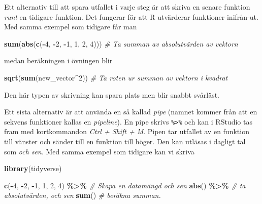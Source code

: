 \documentclass[
]{book}
\newenvironment{Shaded}{\begin{snugshade}}{\end{snugshade}}
\newcommand{\CommentTok}[1]{\textcolor[rgb]{0.56,0.35,0.01}{\textit{#1}}}
\newcommand{\DecValTok}[1]{\textcolor[rgb]{0.00,0.00,0.81}{#1}}
\newcommand{\FunctionTok}[1]{\textcolor[rgb]{0.13,0.29,0.53}{\textbf{#1}}}
\newcommand{\NormalTok}[1]{#1}
\newcommand{\SpecialCharTok}[1]{\textcolor[rgb]{0.81,0.36,0.00}{\textbf{#1}}}
\theoremstyle{definition}
\theoremstyle{definition}
\theoremstyle{definition}
\theoremstyle{definition}
\theoremstyle{remark}
\begin{document}
Ett alternativ till att spara utfallet i varje steg är att skriva en senare funktion \emph{runt} en tidigare funktion. Det fungerar för att R utvärderar funktioner inifrån-ut. Med samma exempel som tidigare får man

\begin{Shaded}
\begin{Highlighting}[]
\FunctionTok{sum}\NormalTok{(}\FunctionTok{abs}\NormalTok{(}\FunctionTok{c}\NormalTok{(}\SpecialCharTok{{-}}\DecValTok{4}\NormalTok{, }\SpecialCharTok{{-}}\DecValTok{2}\NormalTok{, }\SpecialCharTok{{-}}\DecValTok{1}\NormalTok{, }\DecValTok{1}\NormalTok{, }\DecValTok{2}\NormalTok{, }\DecValTok{4}\NormalTok{)))  }
\CommentTok{\# Ta summan av absolutvärden av vektorn}
\end{Highlighting}
\end{Shaded}

medan beräkningen i övningen blir

\begin{Shaded}
\begin{Highlighting}[]
\FunctionTok{sqrt}\NormalTok{(}\FunctionTok{sum}\NormalTok{(new\_vector}\SpecialCharTok{\^{}}\DecValTok{2}\NormalTok{)) }\CommentTok{\# Ta roten ur summan av vektorn i kvadrat}
\end{Highlighting}
\end{Shaded}

Den här typen av skrivning kan spara plats men blir snabbt svårläst.

Ett sista alternativ är att använda en så kallad \emph{pipe} (namnet kommer från att en sekvens funktioner kallas en \emph{pipeline}). En pipe skrivs \texttt{\%\textgreater{}\%} och kan i RStudio tas fram med kortkommandon \emph{Ctrl + Shift + M}. Pipen tar utfallet av en funktion till vänster och sänder till en funktion till höger. Den kan utläsas i dagligt tal som \emph{och sen}. Med samma exempel som tidigare kan vi skriva

\begin{Shaded}
\begin{Highlighting}[]
\FunctionTok{library}\NormalTok{(tidyverse)}

\FunctionTok{c}\NormalTok{(}\SpecialCharTok{{-}}\DecValTok{4}\NormalTok{, }\SpecialCharTok{{-}}\DecValTok{2}\NormalTok{, }\SpecialCharTok{{-}}\DecValTok{1}\NormalTok{, }\DecValTok{1}\NormalTok{, }\DecValTok{2}\NormalTok{, }\DecValTok{4}\NormalTok{) }\SpecialCharTok{\%\textgreater{}\%}        \CommentTok{\# Skapa en datamängd och sen}
  \FunctionTok{abs}\NormalTok{() }\SpecialCharTok{\%\textgreater{}\%}                       \CommentTok{\# ta absolutvärden, och sen}
  \FunctionTok{sum}\NormalTok{()                           }\CommentTok{\# beräkna summan.}
\end{Highlighting}
\end{Shaded}
\end{document}
